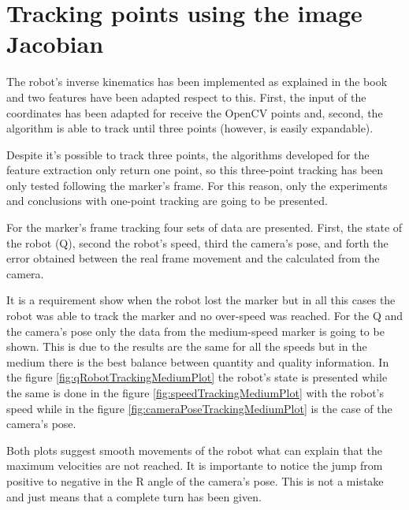 %





\chapter{Tracking points using the image Jacobian} %
\label{chap:tracking_points_using_the_image_jacobian}
The robot's inverse kinematics has been implemented as explained in the book and two features have been adapted respect to this. 
First, the input of the coordinates has been adapted for receive the OpenCV points and, second, the algorithm is able to track until three points (however, is easily expandable).

Despite it's possible to track three points, the algorithms developed for the feature extraction only return one point, so this three-point tracking has been only tested following the marker's frame. 
For this reason, only the experiments and conclusions with one-point tracking are going to be presented.

For the marker's frame tracking four sets of data are presented. 
First, the state of the robot (Q), second the robot's speed, third the camera's pose, and forth the error obtained between the real frame movement and the calculated from the camera.

It is a requirement show when the robot lost the marker but in all this cases the robot was able to track the marker and no over-speed was reached. 
For the Q and the camera's pose only the data from the medium-speed marker is going to be shown. 
This is due to the results are the same for all the speeds but in the medium there is the best balance between quantity and quality information.
In the figure \ref{fig:qRobotTrackingMediumPlot} the robot's state is presented while the same is done in the figure \ref{fig:speedTrackingMediumPlot} with the robot's speed while in the figure \ref{fig:cameraPoseTrackingMediumPlot} is the case of the camera's pose.

	\ifx \plots \yes
		\qRobotTrackingMediumPlot
	\fi
	\ifx \plots \yes
		\speedTrackingMediumPlot
	\fi
	\ifx \plots \yes
		\cameraPoseTrackingMediumPlot
	\fi

Both plots suggest smooth movements of the robot what can explain that the maximum velocities are not reached. It is importante to notice the jump from positive to negative in the R angle of the camera's pose. This is not a mistake and just means that a complete turn has been given.

